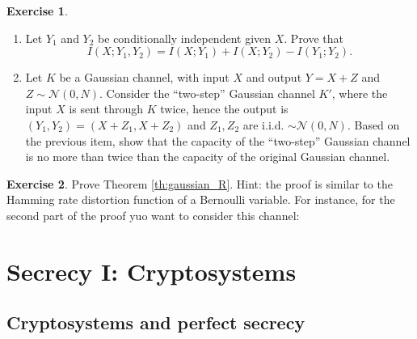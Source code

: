 \documentclass[a4paper, 11pt, openany]{book}
\numberwithin{equation}{section}
\theoremstyle{plain}
\theoremstyle{definition}
\newtheorem{exercise}   {Exercise}  [section]
\newcommand{\alphabet}[1]{\mathcal{#1}}
\begin{document}
\begin{exercise}
\begin{enumerate}
	\item Let $Y_1$ and $Y_2$ be conditionally independent given $X$. Prove that
	\[
		I(X; Y_1, Y_2) = I(X; Y_1) + I(X; Y_2) - I(Y_1; Y_2).
	\]
	
	\item Let $K$ be a Gaussian channel, with input $X$ and output $Y = X + Z$ and $Z \sim \alphabet{N}(0,N)$. Consider the ``two-step'' Gaussian channel $K'$, where the input $X$ is sent through $K$ twice, hence the output is $(Y_1, Y_2) = (X + Z_1, X + Z_2)$ and $Z_1, Z_2$ are i.i.d. $ \sim \alphabet{N}(0,N)$. Based on the previous item, show that the capacity of the ``two-step'' Gaussian channel is no more than twice than the capacity of the original Gaussian channel.
\end{enumerate}
\end{exercise}



\begin{exercise}
Prove Theorem \ref{th:gaussian_R}. Hint: the proof is similar to the Hamming rate distortion function of a Bernoulli variable. For instance, for the second part of the proof yuo want to consider this channel:

\begin{center}
\end{center}

\end{exercise}














\section{Secrecy I: Cryptosystems}
\label{sec:39}


\subsection{Cryptosystems and perfect secrecy}
\end{document}
